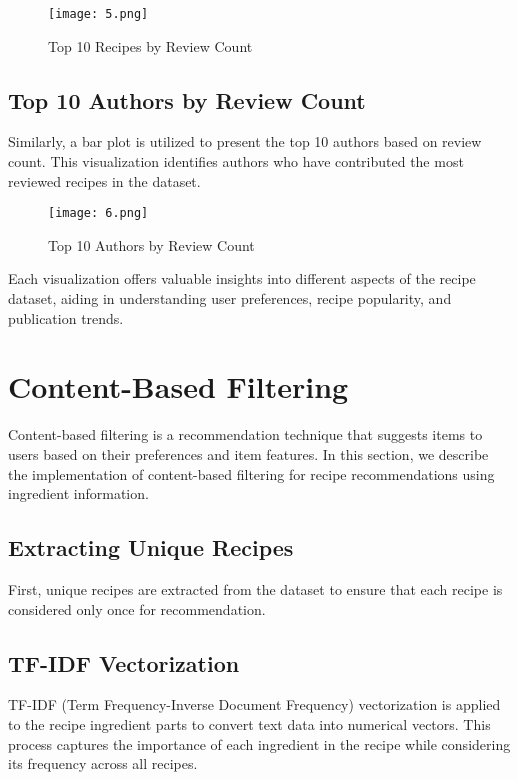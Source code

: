\documentclass[conference]{IEEEtran}
\begin{document}
\begin{figure}[H]
\centering
\texttt{[image: 5.png]}
\caption{Top 10 Recipes by Review Count}
\label{fig:top10_recipes}
\end{figure}

\subsection{Top 10 Authors by Review Count}

Similarly, a bar plot is utilized to present the top 10 authors based on review count. This visualization identifies authors who have contributed the most reviewed recipes in the dataset.

\begin{figure}[H]
\centering
\texttt{[image: 6.png]}
\caption{Top 10 Authors by Review Count}
\label{fig:top10_authors}
\end{figure}

Each visualization offers valuable insights into different aspects of the recipe dataset, aiding in understanding user preferences, recipe popularity, and publication trends.

\section{Content-Based Filtering}

Content-based filtering is a recommendation technique that suggests items to users based on their preferences and item features. In this section, we describe the implementation of content-based filtering for recipe recommendations using ingredient information.

\subsection{Extracting Unique Recipes}

First, unique recipes are extracted from the dataset to ensure that each recipe is considered only once for recommendation.

\subsection{TF-IDF Vectorization}

TF-IDF (Term Frequency-Inverse Document Frequency) vectorization is applied to the recipe ingredient parts to convert text data into numerical vectors. This process captures the importance of each ingredient in the recipe while considering its frequency across all recipes.
\end{document}
